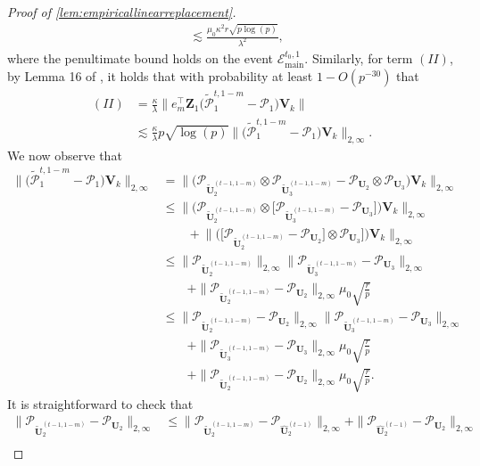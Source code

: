 \documentclass[10pt]{article}
\newcommand{\0}{{\mathbf{0}}}
\newcommand{\1}{{\mathbf{1}}}
\newcommand{\U}{{\mathbf{U}}}
\renewcommand{\citet}{\cite}
\renewcommand{\t}{^{\top}}
\newcommand{\utilde}{\mathbf{\tilde{U}}}
\newcommand{\uhat}{\mathbf{\hat{U}}}
\renewcommand{\tilde}{\widetilde}
\renewcommand{\hat}{\widehat}
\renewcommand{\hat}{\widehat}
\begin{document}
\begin{proof}[Proof of \cref{lem:empiricallinearreplacement}]
\begin{align*}
    &\lesssim \frac{ \mu_0 \kappa^2 r \sqrt{p\log(p)}}{\lambda^2},
\end{align*}
where the penultimate bound holds on the event $\mathcal{E}_{\mathrm{main}}^{t_0,1}$.  
Similarly, for term $(II)$, by Lemma 16 of \citet{agterberg_estimating_2022}, it holds that with probability at least $1 - O(p^{-30})$ that
\begin{align*}
    (II) &=  \frac{\kappa}{\lambda} \bigg\| e_m\t \mathbf{Z}_1 \bigg( \mathcal{\tilde P}_{1}^{t,1-m} - \mathcal{ P}_1 \bigg) \mathbf{V}_k \bigg\| \\
    &\lesssim \frac{\kappa}{\lambda} p \sqrt{\log(p)} \bigg\| \bigg( \mathcal{\tilde P}_{1}^{t,1-m} - \mathcal{ P}_1 \bigg) \mathbf{V}_k \bigg\|_{2,\infty}.
\end{align*}
We now observe that
\begin{align*}
    \| \bigg( \mathcal{\tilde P}_1^{t,1-m} - \mathcal{P}_1 \bigg) \mathbf{V}_k \bigg\|_{2,\infty} &=  \bigg\| \bigg( \mathcal{P}_{\utilde_2^{(t-1,1-m)}} \otimes \mathcal{P}_{\utilde_3^{(t-1,1-m)}} - \mathcal{P}_{\U_2} \otimes \mathcal{P}_{\U_3} \bigg) \mathbf{V}_k \bigg\|_{2,\infty}  \\
    &\leq \bigg\| \bigg( \mathcal{P}_{\utilde_2^{(t-1,1-m)}} \otimes \bigg[ \mathcal{P}_{\utilde_3^{(t-1,1-m)}} - \mathcal{P}_{\U_3} \bigg]\bigg) \mathbf{V}_k \bigg\|_{2,\infty}  \\
    &\qquad + \bigg\| \bigg(\bigg[ \mathcal{P}_{\utilde_2^{(t-1,1-m)}} - \mathcal{P}_{\U_2} \bigg] \otimes  \mathcal{P}_{\U_3} \bigg] \bigg) \mathbf{V}_k \bigg\|_{2,\infty} \\
    &\leq \| \mathcal{P}_{\utilde_2^{(t-1,1-m)}} \|_{2,\infty} \| \mathcal{P}_{\utilde_3^{(t-1,1-m)}} - \mathcal{P}_{\U_3} \|_{2,\infty} \\
    &\qquad + \| \mathcal{P}_{\utilde_2^{(t-1,1-m)}} - \mathcal{P}_{\U_2} \|_{2,\infty}  \mu_0 \sqrt{\frac{r}{p}} \\
    &\leq \| \mathcal{P}_{\utilde_2^{(t-1,1-m)}} - \mathcal{P}_{\U_2} \|_{2,\infty} \| \mathcal{P}_{\utilde_3^{(t-1,1-m)}} - \mathcal{P}_{\U_3} \|_{2,\infty} \\
    &\qquad + \| \mathcal{P}_{\utilde_3^{(t-1,1-m)}} - \mathcal{P}_{\U_3} \|_{2,\infty} \mu_0 \sqrt{\frac{r}{p}} \\
    &\qquad + \| \mathcal{P}_{\utilde_2^{(t-1,1-m)}} - \mathcal{P}_{\U_2} \|_{2,\infty}  \mu_0 \sqrt{\frac{r}{p}}.
\end{align*}
It is straightforward to check that
\begin{align*}
    \| \mathcal{P}_{\utilde_2^{(t-1,1-m)}} - \mathcal{P}_{\U_2} \|_{2,\infty} &\leq \|  \mathcal{P}_{\utilde_2^{(t-1,1-m)}} - \mathcal{P}_{\uhat_2^{(t-1)}} \|_{2,\infty} + \| \mathcal{P}_{\uhat_2^{(t-1)}}  - \mathcal{P}_{\U_2}\|_{2,\infty} \\

\end{align*}
\end{proof}
\end{document}
